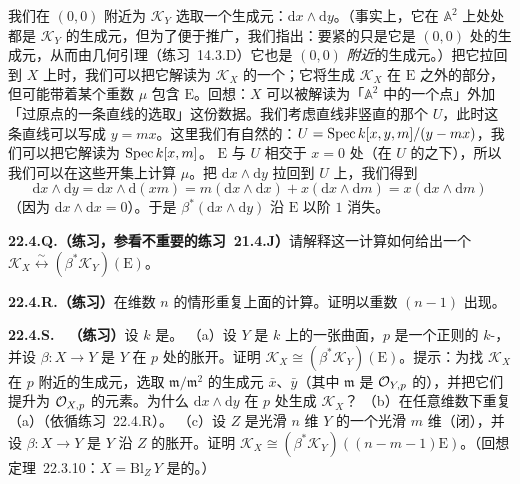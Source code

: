 我们在 $(0,0)$ 附近为 $\mathscr{K}_Y$ 选取一个生成元：$\mathrm{d}x\wedge\mathrm{d}y$。（事实上，它在 $\mathbb{A}^2$ 上处处都是 $\mathscr{K}_Y$ 的生成元，但为了便于推广，我们指出：要紧的只是它是 $(0,0)$ 处的生成元，从而由几何\trNakayama{}引理（\mbox{练习~14.3.D}）它也是 $(0,0)$ \emph{附近}的生成元。）把它拉回到 $X$ 上时，我们可以把它解读为 $\mathscr{K}_X$ 的一个\trSection；它将生成 $\mathscr{K}_X$ 在\trExceptionalDivisor{} $\mathrm{E}$ 之外的部分，但可能带着某个重数 $\mu$ 包含 $\mathrm{E}$。回想：$X$ 可以被解读为「$\mathbb{A}^2$ 中的一个点」外加「过原点的一条直线的选取」这份数据。我们考虑直线非竖直的那个\trOpenSubset{} $U$，此时这条直线可以写成 $y=mx$。这里我们有自然的\trCoordinate：$U=\operatorname{Spec} k[x,y,m]/(y-mx)$，我们可以把它解读为 $\operatorname{Spec} k[x,m]$。\trExceptionalDivisor{} $\mathrm{E}$ 与 $U$ 相交于 $x=0$ 处（在 $U$ 的\trCoordinate{}之下），所以我们可以在这些开集上计算 $\mu$。把 $\mathrm{d}x\wedge\mathrm{d}y$ 拉回到 $U$ 上，我们得到
\[
\mathrm{d}x\wedge\mathrm{d}y=\mathrm{d}x\wedge\mathrm{d}(xm)=m(\mathrm{d}x\wedge\mathrm{d}x)+x(\mathrm{d}x\wedge\mathrm{d}m)=x(\mathrm{d}x\wedge\mathrm{d}m)
\]
（因为 $\mathrm{d}x\wedge\mathrm{d}x=0$）。于是 $\beta^*(\mathrm{d}x\wedge\mathrm{d}y)$ 沿 $\mathrm{E}$ 以阶 $1$ 消失。

\textbf{22.4.Q.（练习，参看不重要的\mbox{练习~21.4.J}）}\quad 请解释这一计算如何给出一个\trCanonical\trIsomorphism{} $\mathscr{K}_X\overset{\sim}{\longleftrightarrow}(\beta^*\mathscr{K}_Y)(\mathrm{E})$。

\textbf{22.4.R.（练习）}\quad 在维数 $n$ 的情形重复上面的计算。证明\trExceptionalDivisor{}以重数 $(n-1)$ 出现。

\textbf{22.4.S.}\ \hard\ \textbf{（练习）}\quad 设 $k$ 是\trPerfectField。
（a）设 $Y$ 是 $k$ 上的一张曲面，$p$ 是一个正则的 $k$-\trValuedPoint，并设 $\beta\colon X\to Y$ 是 $Y$ 在 $p$ 处的胀开。证明 $\mathscr{K}_X\cong(\beta^*\mathscr{K}_Y)(\mathrm{E})$。提示：为找 $\mathscr{K}_X$ 在 $p$ 附近的生成元，选取 $\mathfrak{m}/\mathfrak{m}^2$ 的生成元 $\bar{x}$、$\bar{y}$（其中 $\mathfrak{m}$ 是 $\mathcal{O}_{Y,p}$ 的\trMaximalIdeal），并把它们提升为 $\mathcal{O}_{X,p}$ 的元素。为什么 $\mathrm{d}x\wedge\mathrm{d}y$ 在 $p$ 处生成 $\mathscr{K}_X$？
（b）在任意维数下重复（a）（依循\mbox{练习~22.4.R}）。
（c）设 $Z$ 是光滑 $n$ 维\trVariety{} $Y$ 的一个光滑 $m$ 维（闭）\trSubvariety，并设 $\beta\colon X\to Y$ 是 $Y$ 沿 $Z$ 的胀开。证明 $\mathscr{K}_X\cong(\beta^*\mathscr{K}_Y)((n-m-1)\mathrm{E})$。（回想\mbox{定理~22.3.10}：$X=\mathrm{Bl}_Z\,Y$ 是\trSmooth{}的。）

